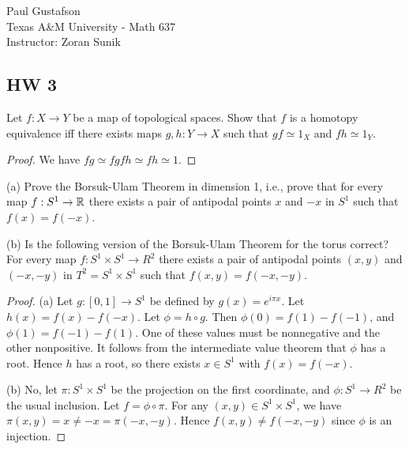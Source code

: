 \documentclass{article}
\begin{document}
\noindent Paul Gustafson\\
\noindent Texas A\&M University - Math 637\\ 
\noindent Instructor: Zoran Sunik

\subsection*{HW 3}
 Let $f : X \to Y$ be a map of topological spaces.  Show that $f$ is a homotopy equivalence iff there exists maps $g,h:Y \to X$ such that 
$gf \simeq 1_X$ and $fh \simeq 1_Y$.
\begin{proof}
We have $fg \simeq fgfh \simeq fh \simeq 1$. 
\end{proof}

 (a) Prove the Borsuk-Ulam Theorem in dimension 1, i.e., prove that for every map $f: S^1 \to \mathbb{R}$ there exists a pair of antipodal points $x$ and $-x$ in $S^1$ such that $f(x) = f(-x)$.

(b) Is the following version of the Borsuk-Ulam Theorem for the torus correct? For every map $f: S^1 \times S^1 \to R^2$ there exists a pair of antipodal points $(x,y)$ and $(-x, -y)$ in $T^2 = S^1 \times S^1$ such that $f(x,y) = f(-x, -y)$.

\begin{proof}
(a) Let $g: [0,1] \to S^1$ be defined by $g(x) = e^{i \pi x}$.  Let $h(x) = f(x) - f(-x)$.  Let $\phi = h \circ g$.  Then $\phi(0) = f(1) - f(-1)$, and $\phi(1) = f(-1) - f(1)$.   One of these values must be nonnegative and the other nonpositive.  It follows from the intermediate value theorem that $\phi$ has a root.  Hence $h$ has a root, so there exists $x \in S^1$ with $f(x) = f(-x)$.

(b) No, let $\pi:S^1 \times S^1$ be the projection on the first coordinate, and $\phi: S^1 \to R^2$ be the usual inclusion.  Let $f = \phi \circ \pi$. For any $(x,y) \in S^1 \times S^1$, we have $\pi(x,y) = x \neq -x = \pi(-x,-y)$.  Hence $f(x,y) \neq f(-x,-y)$ since $\phi$ is an injection.
\end{proof}
\end{document}
